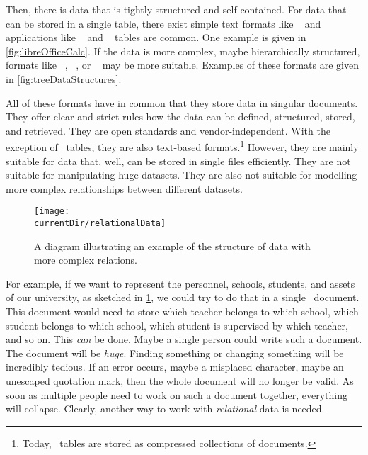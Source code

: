 Then, there is data that is tightly structured and self-contained.
For data that can be stored in a single table, there exist simple text formats like ~\cite{RFC4180} and applications like \microsoftExcel~\cite{B2023DMWME,G2024ECRFMME} and \libreofficeCalc~\cite{S2022L7PFEUU,DF2024LTDF} tables are common.
One example is given in \cref{fig:libreOfficeCalc}.
If the data is more complex, maybe hierarchically structured, formats like ~\cite{BPSMM2008EMLX1FE,K2019ITXJY,CH2013XFCAMLTMC}, ~\cite{E2017SE4TJDIS,RFC8259}, or ~\cite{DNMAASBE2021YAMLYV1,K2019ITXJY,CGTYB2022YFFDCAIE} may be more suitable.
Examples of these formats are given in \cref{fig:treeDataStructures}.

All of these formats have in common that they store data in singular documents.
They offer clear and strict rules how the data can be defined, structured, stored, and retrieved.
They are open standards and vendor-independent.
With the exception of \microsoftExcel\ tables, they are also text-based formats.\footnote{%
Today, \microsoftExcel\ tables are stored as compressed collections of  documents.%
} %
However, they are mainly suitable for data that, well, can be stored in single files efficiently.
They are not suitable for manipulating huge datasets.
They are also not suitable for modelling more complex relationships between different datasets.

\begin{figure}%
\centering%
\texttt{[image: \\currentDir/relationalData]}%
\caption{A diagram illustrating an example of the structure of data with more complex relations.}%
\label{fig:relationalData}%
\end{figure}%

For example, if we want to represent the personnel, schools, students, and assets of our university, as sketched in \cref{fig:relationalData}, we could try to do that in a single ~document.
This document would need to store which teacher belongs to which school, which student belongs to which school, which student is supervised by which teacher, and so on.
This \emph{can} be done.
Maybe a single person could write such a document.
The document will be \emph{huge}.
Finding something or changing something will be incredibly tedious.
If an error occurs, maybe a misplaced character, maybe an unescaped quotation mark, then the whole document will no longer be valid.
As soon as multiple people need to work on such a document together, everything will collapse.
Clearly, another way to work with \emph{relational} data is needed.
